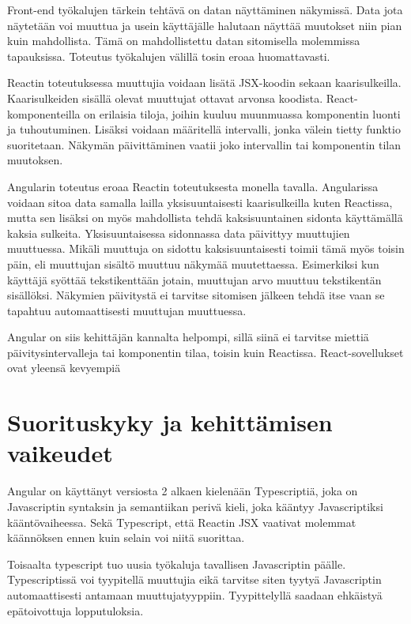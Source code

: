 \documentclass[a4paper,12pt,twoside]{article} %
\begin{document}
Front-end työkalujen tärkein tehtävä on datan näyttäminen näkymissä. Data jota näytetään voi muuttua ja usein käyttäjälle halutaan näyttää muutokset niin pian kuin mahdollista. Tämä on mahdollistettu datan sitomisella molemmissa tapauksissa. Toteutus työkalujen välillä tosin eroaa huomattavasti.

\vspace{4mm}\noindent Reactin toteutuksessa muuttujia voidaan lisätä JSX-koodin sekaan kaarisulkeilla. Kaarisulkeiden sisällä olevat muuttujat ottavat arvonsa koodista. React-komponenteilla on erilaisia tiloja, joihin kuuluu muunmuassa komponentin luonti ja tuhoutuminen. Lisäksi voidaan määritellä intervalli, jonka välein tietty funktio suoritetaan. Näkymän päivittäminen vaatii joko intervallin tai komponentin tilan muutoksen.

\vspace{4mm}\noindent
Angularin toteutus eroaa Reactin toteutuksesta monella tavalla. Angularissa voidaan sitoa data samalla lailla yksisuuntaisesti kaarisulkeilla kuten Reactissa, mutta sen lisäksi on myös mahdollista tehdä kaksisuuntainen sidonta käyttämällä kaksia sulkeita. Yksisuuntaisessa sidonnassa data päivittyy muuttujien muuttuessa. Mikäli muuttuja on sidottu kaksisuuntaisesti toimii tämä myös toisin päin, eli muuttujan sisältö muuttuu näkymää muutettaessa. Esimerkiksi kun käyttäjä syöttää tekstikenttään jotain, muuttujan arvo muuttuu tekstikentän sisällöksi. Näkymien päivitystä ei tarvitse sitomisen jälkeen tehdä itse vaan se tapahtuu automaattisesti muuttujan muuttuessa.

\vspace{4mm}\noindent
Angular on siis kehittäjän kannalta helpompi, sillä siinä ei tarvitse miettiä päivitysintervalleja tai komponentin tilaa, toisin kuin Reactissa. React-sovellukset ovat yleensä kevyempiä 


\newpage

\section{Suorituskyky ja kehittämisen vaikeudet}

Angular on käyttänyt versiosta 2 alkaen kielenään Typescriptiä, joka on Javascriptin syntaksin ja semantiikan perivä kieli, joka kääntyy Javascriptiksi kääntövaiheessa. Sekä Typescript, että Reactin JSX vaativat molemmat käännöksen ennen kuin selain voi niitä suorittaa.\cite{typescript}

\vspace{4mm}\noindent
Toisaalta typescript tuo uusia työkaluja tavallisen Javascriptin päälle. Typescriptissä voi tyypitellä muuttujia eikä tarvitse siten tyytyä Javascriptin automaattisesti antamaan muuttujatyyppiin. Tyypittelyllä saadaan ehkäistyä epätoivottuja lopputuloksia.
\end{document}
